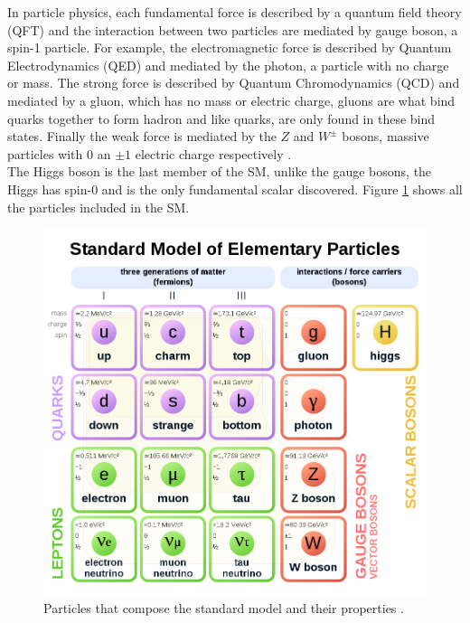 In  particle physics, each fundamental force is described by a quantum field theory (QFT) and the interaction between two particles are mediated by gauge boson, a spin-1 particle.  For example,  the electromagnetic force is described by Quantum Electrodynamics (QED)  and mediated by the photon, a  particle with no charge or mass. The strong force is described by Quantum Chromodynamics (QCD) and mediated by a gluon, which has no mass or electric charge, gluons are what bind quarks together to form hadron and like quarks, are only found in these bind states. Finally the weak force is mediated by the $Z$ and $W^{\pm}$ bosons, massive particles with 0 an $\pm 1$ electric charge respectively
\cite{Thomson:2013zua}.\\
The Higgs boson is the last member of the SM, unlike the gauge bosons, the Higgs has spin-0 and is the only fundamental scalar discovered. Figure \ref{sm1} shows all the particles included in the SM.


\begin{center}
  \begin{figure}[ht]
    \centering
    \includegraphics[scale=0.3]{Chapter1/sm1.png}
    \caption[ Standard model of particles]{Particles that compose the standard model and their properties \cite{smtable}.}
    \label{sm1}
  \end{figure}
\end{center}

